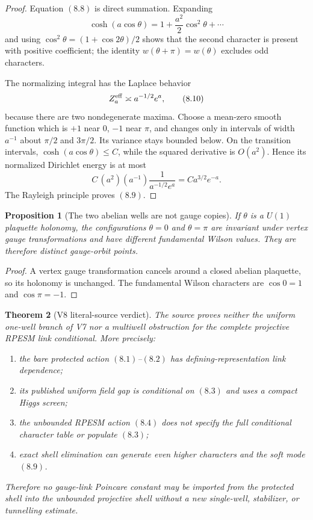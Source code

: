 \documentclass[11pt]{article}
\newtheorem{theorem}{Theorem}[section]
\newtheorem{proposition}[theorem]{Proposition}
\theoremstyle{remark}
\begin{document}
\begin{proof}
Equation \((8.8)\) is direct summation.  Expanding
\[
 \cosh(a\cos\theta)
 =1+\frac{a^2}{2}\cos^2\theta+\cdots
\]
and using
\(\cos^2\theta=(1+\cos2\theta)/2\) shows that the second
character is present with positive coefficient; the identity
\(w(\theta+\pi)=w(\theta)\) excludes odd characters.

The normalizing integral has the Laplace behavior
\[
 Z_a^{\rm eff}\asymp a^{-1/2}e^a,                            \tag{8.10}
\]
because there are two nondegenerate maxima.  Choose a mean-zero
smooth function which is \(+1\) near \(0\), \(-1\) near \(\pi\),
and changes only in intervals of width \(a^{-1}\) about
\(\pi/2\) and \(3\pi/2\).  Its variance stays bounded below.
On the transition intervals,
\(\cosh(a\cos\theta)\le C\), while the squared derivative is
\(O(a^2)\).  Hence its normalized Dirichlet energy is at most
\[
 C\,
 (a^2)(a^{-1})
 \frac1{a^{-1/2}e^a}
 =Ca^{3/2}e^{-a}.                                            \tag{8.11}
\]
The Rayleigh principle proves \((8.9)\).
\end{proof}

\begin{proposition}[The two abelian wells are not gauge copies]
\label{prop:v15v8-physical-wells}
If \(\theta\) is a \(U(1)\) plaquette holonomy, the configurations
\(\theta=0\) and \(\theta=\pi\) are invariant under vertex gauge
transformations and have different fundamental Wilson values.
They are therefore distinct gauge-orbit points.
\end{proposition}

\begin{proof}
A vertex gauge transformation cancels around a closed abelian
plaquette, so its holonomy is unchanged.  The fundamental Wilson
characters are \(\cos0=1\) and \(\cos\pi=-1\).
\end{proof}

\begin{theorem}[V8 literal-source verdict]
\label{thm:v15v8-verdict}
The source proves neither the uniform one-well branch of V7 nor a
multiwell obstruction for the complete projective RPESM link
conditional.  More precisely:
\begin{enumerate}
\item the bare protected action \((8.1)\)--\((8.2)\) has
      defining-representation link dependence;
\item its published uniform field gap is conditional on
      \((8.3)\) and uses a compact Higgs screen;
\item the unbounded RPESM action \((8.4)\) does not specify the
      full conditional character table or populate \((8.3)\);
\item exact shell elimination can generate even higher characters
      and the soft mode \((8.9)\).
\end{enumerate}
Therefore no gauge-link Poincare constant may be imported from the
protected shell into the unbounded projective shell without a new
single-well, stabilizer, or tunnelling estimate.
\end{theorem}
\end{document}

